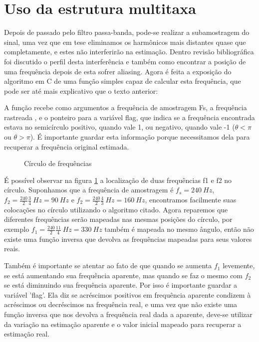 \section{Uso da estrutura multitaxa}

Depois de passado pelo filtro passa-banda, pode-se realizar a subamostragem do sinal, uma vez que em tese eliminamos os harmônicos mais distantes quase que completamente, e estes não interferirão na estimação. Dentro revisão bibliográfica foi discutido o perfil desta interferência e também como encontrar a posição de uma frequência depois de esta sofrer aliasing. Agora é feita a exposição do algoritmo em C de uma função simples capaz de calcular esta frequência, que pode ser até mais explicativo que o texto anterior:



A função recebe como argumentos a frequência de amostragem Fs, a frequência rastreada , e o ponteiro para a variável flag, que indica se a frequência encontrada estava no semicírculo positivo, quando vale 1, ou negativo, quando vale -1 ($\theta<\pi$ ou $\theta>\pi$). É importante guardar esta informação porque necessitamos dela para recuperar a frequência original estimada. 

\begin{figure}[h]
	\centering    
	\def\svgwidth{\columnwidth}
	
	\caption{Círculo de frequências}
	\label{fig:freq_circ}
\end{figure}

\indent É possível observar na figura \ref{fig:freq_circ} a localização de duas frequências f1 e f2 no círculo. Suponhamos que a frequência de amostragem é $f_s=240 \:Hz$, $f_2=\frac{240}{2} \frac{3}{4} \: Hz = 90 \: Hz$ e $f_2=\frac{240}{2} \frac{4}{3} \: Hz = 160 \: Hz$, encontramos facilmente suas colocações no círculo utilizando o algoritmo citado. Agora reparemos que diferentes frequências serão mapeadas nas mesmas posições do círculo, por exemplo $f_1=\frac{240}{2} \frac{11}{4} \: Hz = 330 \: Hz$ também é mapeada no mesmo ângulo, então não existe uma função inversa que devolva as frequências mapeadas para seus valores reais. 

\indent Também é importante se atentar ao fato de que quando se aumenta $f_1$ levemente, se está aumentando sua frequência aparente, mas quando se faz o mesmo com $f_2$ se está diminuindo sua frequência aparente. Por isso é importante guardar a variável 'flag'. Ela diz se acréscimos positivos em frequência aparente condizem à acréscimos ou decréscimos na frequência real, e uma vez que não existe uma função inversa que nos devolva a frequência real dada a aparente, deve-se utilizar da variação na estimação aparente e o valor inicial mapeado para recuperar a estimação real.

